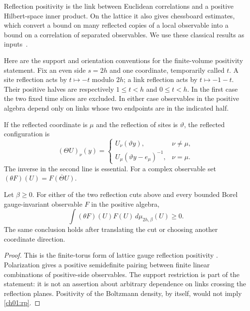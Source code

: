 Reflection positivity is the link between Euclidean correlations and a
positive Hilbert-space inner product. On the lattice it also gives
chessboard estimates, which convert a bound on many reflected copies of a
local observable into a bound on a correlation of separated observables.
We use these classical results as inputs~\cite{OsterwalderSeiler1978,
FrohlichIsraelLiebSimon1978,Seiler1982}.

Here are the support and orientation conventions for the finite-volume
positivity statement. Fix an even side $s=2h$ and one coordinate, temporarily
called $t$. A site reflection acts by $t\mapsto-t$ modulo $2h$; a link
reflection acts by $t\mapsto-1-t$. Their positive halves are respectively
$1\le t<h$ and $0\le t<h$. In the first case the two fixed time slices
are excluded. In either case observables in the positive algebra depend
only on links whose two endpoints are in the indicated half.

If the reflected coordinate is $\mu$ and the reflection of sites is
$\vartheta$, the reflected configuration is
\begin{equation}
 (\Theta U)_\nu(y)=
 \begin{cases}
 U_\nu(\vartheta y),&\nu\ne\mu,\\
 U_\mu(\vartheta y-e_\mu)^{-1},&\nu=\mu.
 \end{cases}
 \label{ch01:reflection-links}
\end{equation}
The inverse in the second line is essential. For a complex observable set
$(\theta F)(U)=\overline{F(\Theta U)}$.

\begin{proposition}
\label{ch01:lattice-rp}
Let $\beta\ge0$. For either of the two reflection cuts above and every
bounded Borel gauge-invariant observable $F$ in the positive algebra,
\begin{equation}
 \int (\theta F)(U)F(U)\,d\mu_{2h,\beta}(U)\ge0.
 \label{ch01:rp}
\end{equation}
The same conclusion holds after translating the cut or choosing another
coordinate direction.
\end{proposition}
\begin{proof}
This is the finite-torus form of lattice gauge reflection positivity
\cite{OsterwalderSeiler1978,Seiler1982}. Polarization gives a positive
semidefinite pairing between finite linear combinations of positive-side
observables. The support restriction is part of the statement: it is not
an assertion about arbitrary dependence on links crossing the reflection
planes. Positivity of the Boltzmann density, by itself, would not imply
\eqref{ch01:rp}.
\end{proof}


